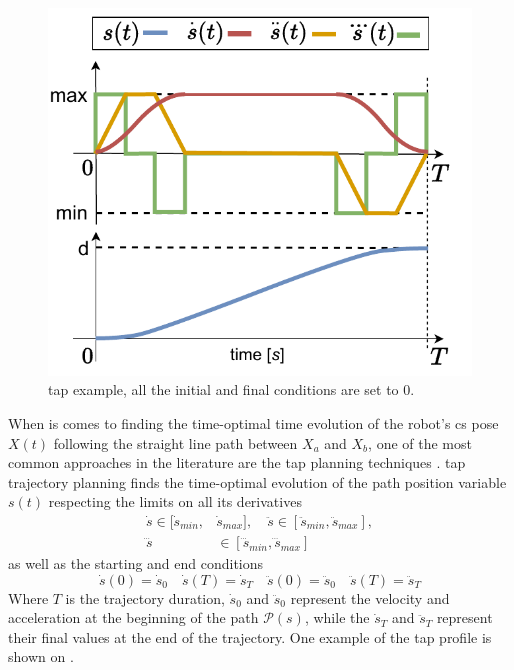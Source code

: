 \begin{figure}
\vspace{-0.5cm}
    \centering
    \includegraphics[width=\linewidth]{Papers/imgs/tap_profile.pdf}
    \caption{\gls{tap} example, all the initial and final conditions are set to 0.}
    \label{fig:tap_profile}
\end{figure}
When is comes to finding the time-optimal time evolution of the robot's \gls{cs} pose $X(t)$ following the straight line path between $X_a$ and $X_b$, one of the most common approaches in the literature are the \gls{tap} planning techniques \cite[Chapter 9.2.2.2]{modernrobotics}. \gls{tap} trajectory planning finds the time-optimal evolution of the path position variable $s(t)$ respecting the limits on all its derivatives
\begin{equation}
\begin{split}
    \dot{s} \in [\dot{s}_{min}, &\dot{s}_{max}], \quad
\ddot{s}\in [\ddot{s}_{min}, \ddot{s}_{max}], \\
\dddot{s}&\in [\dddot{s}_{min}, \dddot{s}_{max}] 
\end{split}\label{eq:s_limits}
\end{equation}
as well as the starting and end conditions 
\begin{equation}
    \dot{s}(0) = \dot{s}_{0} \quad \dot{s}(T) = \dot{s}_{T} \quad
    \ddot{s}(0) = \ddot{s}_{0} \quad \ddot{s}(T) = \ddot{s}_{T}
\end{equation}
Where $T$ is the trajectory duration, $\dot{s}_{0}$ and $\ddot{s}_{0}$ represent the velocity and acceleration at the beginning of the path $\mathscr{P}(s)$, while the $\dot{s}_{T}$ and $\ddot{s}_{T}$ represent their final values at the end of the trajectory. One example of the \gls{tap} profile is shown on .


